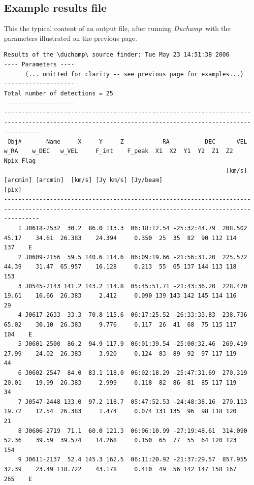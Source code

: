 \documentclass[12pt,a4paper]{article}
\newcommand{\duchamp}{\emph{Duchamp}}
\begin{document}
\begin{landscape}
\newpage
\section{Example results file}
\label{app-output}
This the typical content of an output file, after running \duchamp\
with the parameters illustrated on the previous page. 

{\scriptsize 
  \begin{verbatim}
Results of the \duchamp\ source finder: Tue May 23 14:51:38 2006
---- Parameters ----
      (... omitted for clarity -- see previous page for examples...)
--------------------
Total number of detections = 25
--------------------
------------------------------------------------------------------------------------------------------------------------------------------------------
 Obj#       Name     X     Y     Z           RA          DEC      VEL     w_RA    w_DEC   w_VEL     F_int    F_peak  X1  X2  Y1  Y2  Z1  Z2  Npix Flag
                                                               [km/s] [arcmin] [arcmin]  [km/s] [Jy km/s] [Jy/beam]                         [pix]     
------------------------------------------------------------------------------------------------------------------------------------------------------
    1 J0618-2532  30.2  86.0 113.3  06:18:12.54 -25:32:44.79  208.502    45.17    34.61  26.383    24.394     0.350  25  35  82  90 112 114   137    E
    2 J0609-2156  59.5 140.6 114.6  06:09:19.66 -21:56:31.20  225.572    44.39    31.47  65.957    16.128     0.213  55  65 137 144 113 118   153     
    3 J0545-2143 141.2 143.2 114.8  05:45:51.71 -21:43:36.20  228.470    19.61    16.66  26.383     2.412     0.090 139 143 142 145 114 116    29     
    4 J0617-2633  33.3  70.8 115.6  06:17:25.52 -26:33:33.83  238.736    65.02    30.10  26.383     9.776     0.117  26  41  68  75 115 117   104    E
    5 J0601-2500  86.2  94.9 117.9  06:01:39.54 -25:00:32.46  269.419    27.99    24.02  26.383     3.920     0.124  83  89  92  97 117 119    44     
    6 J0602-2547  84.0  83.1 118.0  06:02:18.29 -25:47:31.69  270.319    20.01    19.99  26.383     2.999     0.118  82  86  81  85 117 119    34     
    7 J0547-2448 133.0  97.2 118.7  05:47:52.53 -24:48:38.16  279.113    19.72    12.54  26.383     1.474     0.074 131 135  96  98 118 120    21     
    8 J0606-2719  71.1  60.0 121.3  06:06:10.99 -27:19:48.61  314.090    52.36    39.59  39.574    14.268     0.150  65  77  55  64 120 123   154     
    9 J0611-2137  52.4 145.3 162.5  06:11:20.92 -21:37:29.57  857.955    32.39    23.49 118.722    43.178     0.410  49  56 142 147 158 167   265    E

\end{verbatim}}
\end{landscape}
\end{document}
